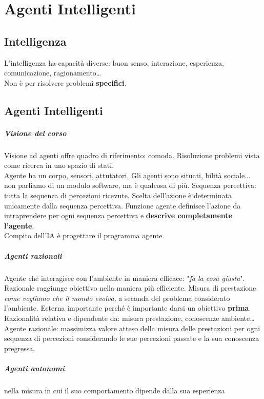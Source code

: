 \documentclass[10pt]{book}
\begin{document}
\chapter{Agenti Intelligenti}
\section{Intelligenza}
L'intelligenza ha capacità diverse: buon senso, interazione, esperienza, comunicazione, ragionamento\ldots\\
Non è per risolvere problemi \textbf{specifici}.
\section{Agenti Intelligenti}
\paragraph{Visione del corso} Visione ad agenti offre quadro di riferimento: comoda. Risoluzione problemi vista come ricerca in uno spazio di stati.\\
Agente ha un corpo, sensori, attutatori. Gli agenti sono situati, bilità sociale... non parliamo di un modulo software, ma è qualcosa di più.
Sequenza percettiva: tutta la sequenza di percezioni ricevute. Scelta dell'azione è determinata unicamente dalla sequenza percettiva. Funzione agente definisce l'azione da intraprendere per ogni sequenza percettiva e \textbf{descrive completamente l'agente}.\\
Compito dell'IA è progettare il programma agente.
\paragraph{Agenti razionali} Agente che interagisce con l'ambiente in maniera efficace: "\textit{fa la cosa giusta}". Razionale raggiunge obiettivo nella maniera più efficiente. Misura di prestazione \textit{come vogliamo che il mondo evolva}, a seconda del problema considerato l'ambiente. Esterna importante perché è importante darsi un obiettivo \textbf{prima}.\\
Razionalità relativa e dipendente da: misura prestazione, conoscenze ambiente\ldots\\
Agente razionale: massimizza valore atteso della misura delle prestazioni per ogni sequenza di percezioni considerando le sue percezioni passate e la sua conoscenza pregressa.
\paragraph{Agenti autonomi} nella misura in cui il suo comportamento dipende dalla sua esperienza
\end{document}
